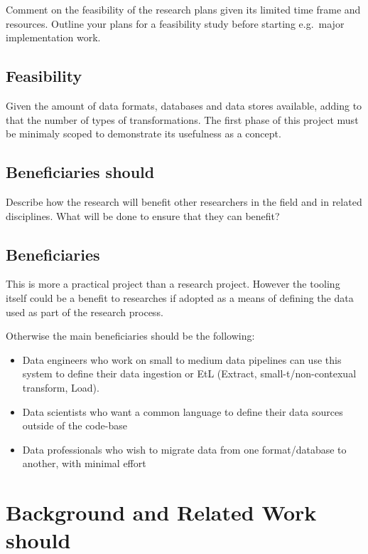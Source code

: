 Comment on the feasibility of the research plans given its limited time
frame and resources. Outline your plans for a feasibility study before
starting e.g.~major implementation work.

\subsection{Feasibility}\label{feasibility}

Given the amount of data formats, databases and data stores available,
adding to that the number of types of transformations. The first phase
of this project must be minimaly scoped to demonstrate its usefulness as
a concept.

\subsection{Beneficiaries should}\label{beneficiaries-should}

Describe how the research will benefit other researchers in the field
and in related disciplines. What will be done to ensure that they can
benefit?

\subsection{Beneficiaries}\label{beneficiaries}

This is more a practical project than a research project. However the
tooling itself could be a benefit to researches if adopted as a means of
defining the data used as part of the research process.

Otherwise the main beneficiaries should be the following:

\begin{itemize}
\tightlist
\item
  Data engineers who work on small to medium data pipelines can use this
  system to define their data ingestion or EtL (Extract,
  small-t/non-contexual transform, Load).
\item
  Data scientists who want a common language to define their data
  sources outside of the code-base
\item
  Data professionals who wish to migrate data from one format/database
  to another, with minimal effort
\end{itemize}

\section{Background and Related Work
should}\label{background-and-related-work-should}

